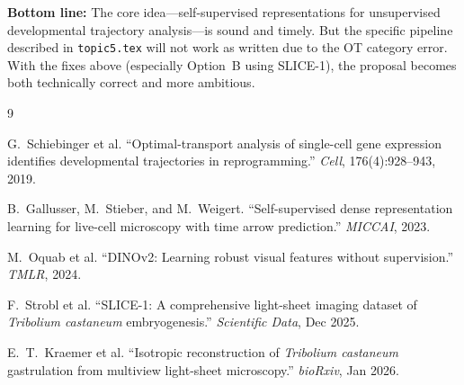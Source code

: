 \documentclass{article}
\begin{document}
\noindent\textbf{Bottom line:} The core idea---self-supervised representations
for unsupervised developmental trajectory analysis---is sound and timely. But
the specific pipeline described in \texttt{topic5.tex} will not work as written
due to the OT category error. With the fixes above (especially Option~B using
SLICE-1), the proposal becomes both technically correct and more ambitious.

\begin{thebibliography}{9}

	 G.~Schiebinger et al.
	``Optimal-transport analysis of single-cell gene expression identifies
	developmental trajectories in reprogramming.''
	\textit{Cell}, 176(4):928--943, 2019.

	 B.~Gallusser, M.~Stieber, and M.~Weigert.
	``Self-supervised dense representation learning for live-cell microscopy
	with time arrow prediction.''
	\textit{MICCAI}, 2023.

	 M.~Oquab et al.
	``DINOv2: Learning robust visual features without supervision.''
	\textit{TMLR}, 2024.

	 F.~Strobl et al.
	``SLICE-1: A comprehensive light-sheet imaging dataset of \textit{Tribolium
		castaneum} embryogenesis.''
	\textit{Scientific Data}, Dec 2025.

	 E.~T.~Kraemer et al.
	``Isotropic reconstruction of \textit{Tribolium castaneum} gastrulation
	from multiview light-sheet microscopy.''
	\textit{bioRxiv}, Jan 2026.

\end{thebibliography}
\end{document}
